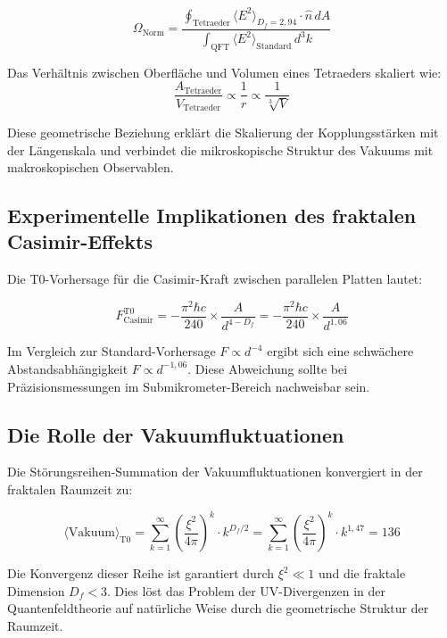 \documentclass[12pt,a4paper]{article}
\theoremstyle{definition}
\begin{document}
	\begin{equation}
		\Omega_{\text{Norm}} = \frac{\oint_{\text{Tetraeder}} \langle E^2 \rangle_{D_f=2{,}94} \cdot \hat{n} \, dA}{\int_{\text{QFT}} \langle E^2 \rangle_{\text{Standard}} \, d^3k}
	\end{equation}
	
	Das Verhältnis zwischen Oberfläche und Volumen eines Tetraeders skaliert wie:
	\begin{equation}
		\frac{A_{\text{Tetraeder}}}{V_{\text{Tetraeder}}} \propto \frac{1}{r} \propto \frac{1}{\sqrt[3]{V}}
	\end{equation}
	
	Diese geometrische Beziehung erklärt die Skalierung der Kopplungsstärken mit der Längenskala und verbindet die mikroskopische Struktur des Vakuums mit makroskopischen Observablen.
	
	\subsection{Experimentelle Implikationen des fraktalen Casimir-Effekts}
	
	Die T0-Vorhersage für die Casimir-Kraft zwischen parallelen Platten lautet:
	
	\begin{equation}
		F_{\text{Casimir}}^{\text{T0}} = -\frac{\pi^2 \hbar c}{240} \times \frac{A}{d^{4-D_f}} = -\frac{\pi^2 \hbar c}{240} \times \frac{A}{d^{1{,}06}}
	\end{equation}
	
	Im Vergleich zur Standard-Vorhersage $F \propto d^{-4}$ ergibt sich eine schwächere Abstandsabhängigkeit $F \propto d^{-1{,}06}$. Diese Abweichung sollte bei Präzisionsmessungen im Submikrometer-Bereich nachweisbar sein.
	
	\subsection{Die Rolle der Vakuumfluktuationen}
	
	Die Störungsreihen-Summation der Vakuumfluktuationen konvergiert in der fraktalen Raumzeit zu:
	
	\begin{equation}
		\langle \text{Vakuum} \rangle_{\text{T0}} = \sum_{k=1}^{\infty} \left(\frac{\xi^2}{4\pi}\right)^k \cdot k^{D_f/2} = \sum_{k=1}^{\infty} \left(\frac{\xi^2}{4\pi}\right)^k \cdot k^{1{,}47} = 136
	\end{equation}
	
	Die Konvergenz dieser Reihe ist garantiert durch $\xi^2 \ll 1$ und die fraktale Dimension $D_f < 3$. Dies löst das Problem der UV-Divergenzen in der Quantenfeldtheorie auf natürliche Weise durch die geometrische Struktur der Raumzeit.
	
\end{document}

